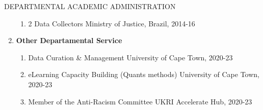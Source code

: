 \begin{rSection}{DEPARTMENTAL ACADEMIC ADMINISTRATION}
\begin{enumerate}[label=\Roman*]
\begin{enumerate}[label=(\roman*)]
\item {2 Data Collectors} \hfill{Ministry of Justice, Brazil, 2014-16}
\end{enumerate}

\item {\textbf{Other Departamental Service}}
\par

\begin{enumerate}[label=(\roman*)]
\item {Data Curation \& Management} \hfill{University of Cape Town, 2020-23}

\item {eLearning Capacity Building (Quants methods)} \hfill{University of Cape Town, 2020-23}

\item {Member of the Anti-Racism Committee}  \hfill{UKRI Accelerate Hub, 2020-23}
\end{enumerate}

\end{enumerate}

\end{rSection}